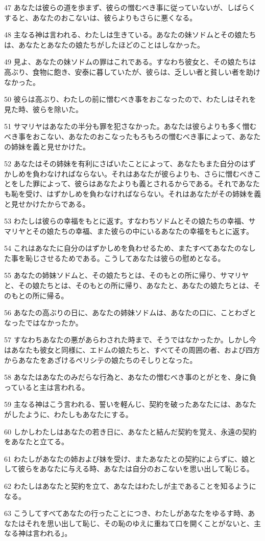 \par 47 あなたは彼らの道を歩まず、彼らの憎むべき事に従っていないが、しばらくすると、あなたのおこないは、彼らよりもさらに悪くなる。
\par 48 主なる神は言われる、わたしは生きている。あなたの妹ソドムとその娘たちは、あなたとあなたの娘たちがしたほどのことはしなかった。
\par 49 見よ、あなたの妹ソドムの罪はこれである。すなわち彼女と、その娘たちは高ぶり、食物に飽き、安泰に暮していたが、彼らは、乏しい者と貧しい者を助けなかった。
\par 50 彼らは高ぶり、わたしの前に憎むべき事をおこなったので、わたしはそれを見た時、彼らを除いた。
\par 51 サマリヤはあなたの半分も罪を犯さなかった。あなたは彼らよりも多く憎むべき事をおこない、あなたのおこなったもろもろの憎むべき事によって、あなたの姉妹を義と見せかけた。
\par 52 あなたはその姉妹を有利にさばいたことによって、あなたもまた自分のはずかしめを負わなければならない。それはあなたが彼らよりも、さらに憎むべきことをした罪によって、彼らはあなたよりも義とされるからである。それであなたも恥を受け、はずかしめを負わなければならない。それはあなたがその姉妹を義と見せかけたからである。
\par 53 わたしは彼らの幸福をもとに返す。すなわちソドムとその娘たちの幸福、サマリヤとその娘たちの幸福、また彼らの中にいるあなたの幸福をもとに返す。
\par 54 これはあなたに自分のはずかしめを負わせるため、またすべてあなたのなした事を恥じさせるためである。こうしてあなたは彼らの慰めとなる。
\par 55 あなたの姉妹ソドムと、その娘たちとは、そのもとの所に帰り、サマリヤと、その娘たちとは、そのもとの所に帰り、あなたと、あなたの娘たちとは、そのもとの所に帰る。
\par 56 あなたの高ぶりの日に、あなたの姉妹ソドムは、あなたの口に、ことわざとなったではなかったか。
\par 57 すなわちあなたの悪があらわされた時まで、そうではなかったか。しかし今はあなたも彼女と同様に、エドムの娘たちと、すべてその周囲の者、および四方からあなたをあざけるペリシテの娘たちのそしりとなった。
\par 58 あなたはあなたのみだらな行為と、あなたの憎むべき事のとがとを、身に負っていると主は言われる。
\par 59 主なる神はこう言われる、誓いを軽んじ、契約を破ったあなたには、あなたがしたように、わたしもあなたにする。
\par 60 しかしわたしはあなたの若き日に、あなたと結んだ契約を覚え、永遠の契約をあなたと立てる。
\par 61 わたしがあなたの姉および妹を受け、またあなたとの契約によらずに、娘として彼らをあなたに与える時、あなたは自分のおこないを思い出して恥じる。
\par 62 わたしはあなたと契約を立て、あなたはわたしが主であることを知るようになる。
\par 63 こうしてすべてあなたの行ったことにつき、わたしがあなたをゆるす時、あなたはそれを思い出して恥じ、その恥のゆえに重ねて口を開くことがないと、主なる神は言われる」。

